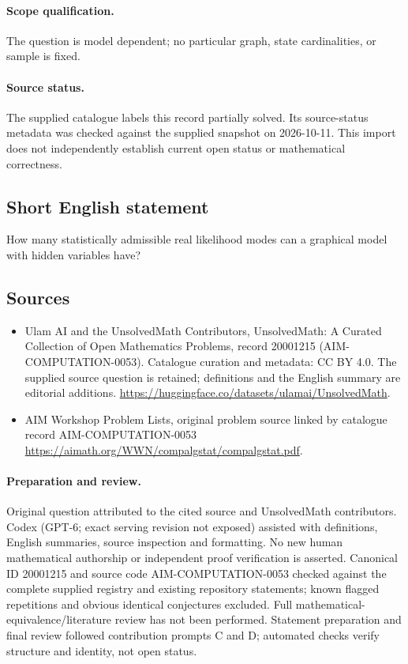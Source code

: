 \documentclass[11pt]{article}
\begin{document}
\paragraph{Scope qualification.}
The question is model dependent; no particular graph, state cardinalities, or sample is fixed.
\paragraph{Source status.}
The supplied catalogue labels this record partially solved. Its source-status metadata was checked against the supplied snapshot on 2026-10-11. This import does not independently establish current open status or mathematical correctness.
\subsection{Short English statement}
How many statistically admissible real likelihood modes can a graphical model with hidden variables have?
\subsection{Sources}
\begin{itemize}
\item[S1] Ulam AI and the UnsolvedMath Contributors, UnsolvedMath: A Curated Collection of Open Mathematics Problems, record 20001215 (AIM-COMPUTATION-0053). Catalogue curation and metadata: CC BY 4.0. The supplied source question is retained; definitions and the English summary are editorial additions.
\url{https://huggingface.co/datasets/ulamai/UnsolvedMath}.
\item[S2] AIM Workshop Problem Lists, original problem source linked by catalogue record AIM-COMPUTATION-0053
\url{https://aimath.org/WWN/compalgstat/compalgstat.pdf}.
\end{itemize}
\paragraph{Preparation and review.}
Original question attributed to the cited source and UnsolvedMath contributors. Codex (GPT-6; exact serving revision not exposed) assisted with definitions, English summaries, source inspection and formatting. No new human mathematical authorship or independent proof verification is asserted. Canonical ID 20001215 and source code AIM-COMPUTATION-0053 checked against the complete supplied registry and existing repository statements; known flagged repetitions and obvious identical conjectures excluded. Full mathematical-equivalence/literature review has not been performed. Statement preparation and final review followed contribution prompts C and D; automated checks verify structure and identity, not open status.
\label{end:20001215}
\end{document}
